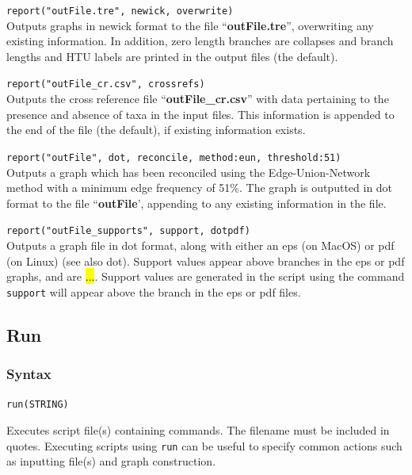 	\begin{example}
		\item{\texttt{report("outFile.tre", newick, overwrite)}\\ Outputs graphs in newick 
		format to the file ``\textbf{outFile.tre}'', overwriting any existing information.
		In addition, zero length branches are collapses and branch lengths and HTU 
		labels are printed in the output files (the default).}
		
		\item{\texttt{report("outFile\_cr.csv", crossrefs)}\\ Outputs the cross reference file 
		``\textbf{outFile\_cr.csv}'' with data pertaining to the presence and absence of 
		taxa in the input files. This information is appended to the end of the file (the 
		default), if existing information exists.}
		
		\item{\texttt{report("outFile", dot, reconcile, method:eun, threshold:51)}\\ Outputs a
		graph which has been reconciled using the Edge-Union-Network method with a 
		minimum edge frequency of 51\%. The graph is outputted in dot format to the 
		file ``\textbf{outFile}', appending to any existing information in the file.}
		
		\item{\texttt{report("outFile\_supports", support, dotpdf)}\\ Outputs a graph file in 
		dot format, along with either an eps (on MacOS) or pdf (on Linux) (see also dot). 
		Support values appear above branches in the eps or pdf graphs, and are \hl{...}.
		Support values are generated in the script using the command \texttt{support}
		will appear above the branch in the eps or pdf files.}
	\end{example}
		
\subsection{Run}
	\subsubsection{Syntax}
		\texttt{run(STRING)}
		
	\begin{phygdescription}
		{Executes \phyg script file(s) containing commands. The filename must be 
		included in quotes. Executing scripts using \texttt{run} can be useful to specify 
		common actions such as inputting file(s) and graph construction.}
	\end{phygdescription}
	
